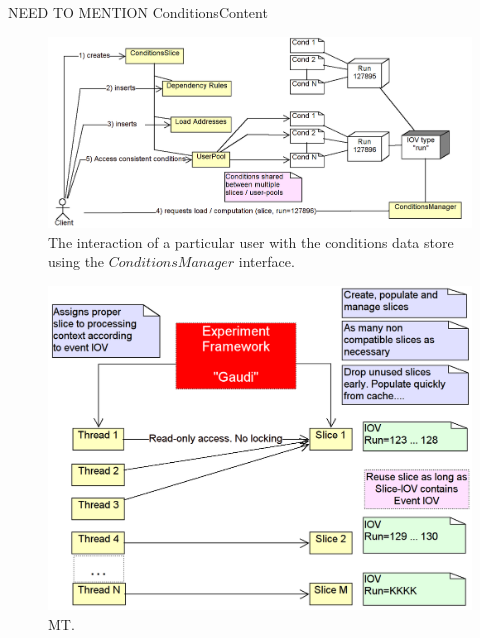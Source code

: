 \documentclass[10pt,a4paper]{article}
\begin{document}
NEED TO MENTION ConditionsContent


\begin{figure}[h]
  \begin{center}\includegraphics[width=15cm] {DDCond-ConditionsAccess.png}
    \caption{The interaction of a particular user with the conditions
             data store using the $ConditionsManager$ interface.}
    \label{fig:ddcond-slice-usage}
  \end{center}
\end{figure}
\vspace{-0.5cm}

\begin{figure}[h]
  \begin{center}\includegraphics[width=15cm] {DDCond-ConditionsMT.png}
    \caption{MT.}
    \label{fig:ddcond-multi-threaded-processing}
  \end{center}
\end{figure}
\vspace{-0.5cm}
\end{document}
